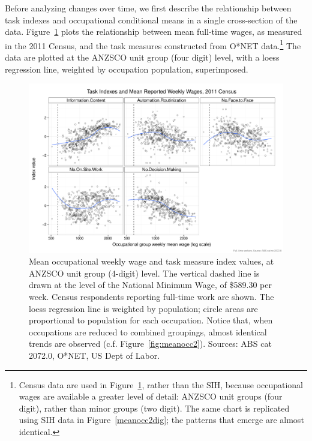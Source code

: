 Before analyzing changes over time, we first describe the relationship between task indexes and occupational conditional means in a single cross-section of the data. Figure~\ref{fig:meanocc4dig} plots the relationship between mean full-time wages, as measured in the 2011 Census, and the task measures constructed from O*NET data.\footnote{Census data are used in Figure~\ref{fig:meanocc4dig}, rather than the SIH, because occupational wages are available a greater level of detail: ANZSCO unit groups (four digit), rather than minor groups (two digit). The same chart is replicated using SIH data in Figure~\ref{meanocc2dig}; the patterns that emerge are almost identical.} The data are plotted at the ANZSCO unit group (four digit) level, with a loess regression line, weighted by occupation population, superimposed.

\begin{figure}
  \centering
  \includegraphics[width=\textwidth]{../figure/wages_indexes_4digit.pdf}
  \caption{Mean occupational weekly wage and task measure index values, at ANZSCO unit group (4-digit) level. The vertical dashed line is drawn at the level of the National Minimum Wage, of \$589.30 per week. Census respondents reporting full-time work are shown. The loess regression line is weighted by population; circle areas are proportional to population for each occupation. Notice that, when occupations are reduced to combined groupings, almost identical trends are observed (c.f. Figure~\ref{fig:meanocc2}). Sources: ABS cat 2072.0, O*NET, US Dept of Labor.}
  \label{fig:meanocc4dig}
\end{figure}

